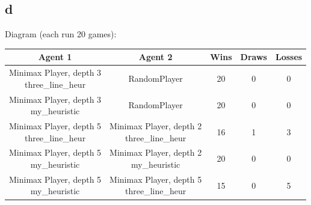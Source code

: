\documentclass[12pt]{article}
\begin{document}
\begin{enumerate}
\part{d} Diagram (each run 20 games):

	\begin{tabular}{|c|c|c|c|c|}
	\hline
 	Agent 1 & Agent 2 & Wins & Draws & Losses \\
	\hline
	\makecell{Minimax Player, depth 3 \\ three\_line\_heur} & RandomPlayer & 20 & 0 & 0 \\
	\hline
	\makecell{Minimax Player, depth 3 \\ my\_heuristic} & RandomPlayer & 20 & 0 & 0 \\
	\hline
	\makecell{Minimax Player, depth 5 \\ three\_line\_heur} & \makecell{Minimax Player, depth 2 \\ three\_line\_heur} & 16 & 1 & 3 \\
	\hline
 	\makecell{Minimax Player, depth 5 \\ my\_heuristic} & \makecell{Minimax Player, depth 2 \\ my\_heuristic} & 20 & 0 & 0 \\
	\hline
	\makecell{Minimax Player, depth 5 \\ my\_heuristic} & \makecell{Minimax Player, depth 5 \\ three\_line\_heur} & 15 & 0 & 5 \\
	\hline
	\end{tabular}

\end{enumerate}

\newpage
\end{document}
